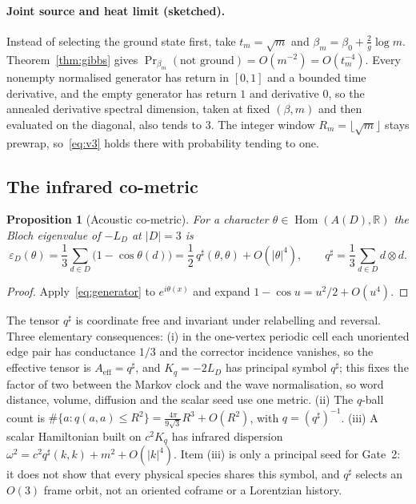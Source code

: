 \documentclass[11pt]{article}
\newtheorem{proposition}[theorem]{Proposition}
\theoremstyle{definition}
\theoremstyle{remark}
\newcommand{\R}{\mathbb{R}}
\begin{document}
\paragraph{Joint source and heat limit (sketched).} Instead of selecting the ground state
first, take $t_m=\sqrt m$ and $\beta_m=\beta_0+\frac2g\log m$. Theorem~\ref{thm:gibbs}
gives $\Pr_{\beta_m}(\text{not ground})=O(m^{-2})=O(t_m^{-4})$. Every nonempty normalised
generator has return in $[0,1]$ and a bounded time derivative, and the empty generator
has return $1$ and derivative $0$, so the annealed derivative spectral dimension, taken
at fixed $(\beta,m)$ and then evaluated on the diagonal, also tends to $3$. The integer
window $R_m=\lfloor\sqrt m\rfloor$ stays prewrap, so~\eqref{eq:v3} holds there with
probability tending to one.

\subsection{The infrared co-metric}
\label{sec:cometric}

\begin{proposition}[Acoustic co-metric]
\label{prop:cometric}
For a character $\theta\in\operatorname{Hom}(A(D),\R)$ the Bloch eigenvalue of $-L_D$ at
$|D|=3$ is
\begin{equation}
\varepsilon_D(\theta)=\frac13\sum_{d\in D}\bigl(1-\cos\theta(d)\bigr)
=\frac12\,q^\sharp(\theta,\theta)+O(|\theta|^4),\qquad
q^\sharp=\frac13\sum_{d\in D}d\otimes d .
\label{eq:cometric}
\end{equation}
\end{proposition}

\begin{proof}
Apply~\eqref{eq:generator} to $e^{i\theta(x)}$ and expand $1-\cos u=u^2/2+O(u^4)$.
\end{proof}

The tensor $q^\sharp$ is coordinate free and invariant under relabelling and
reversal. Three elementary consequences: (i) in the one-vertex periodic cell each
unoriented edge pair has conductance $1/3$ and the corrector incidence vanishes, so the
effective tensor is $A_{\mathrm{eff}}=q^\sharp$, and $K_q=-2L_D$ has principal symbol
$q^\sharp$; this fixes the factor of two between the Markov clock and the wave
normalisation, so word distance, volume, diffusion and the scalar seed use one metric.
(ii) The $q$-ball count is $\#\{a: q(a,a)\le R^2\}=\frac{4\pi}{9\sqrt3}R^3+O(R^2)$, with
$q=(q^\sharp)^{-1}$. (iii) A scalar Hamiltonian built on $c^2K_q$ has infrared dispersion
$\omega^2=c^2q^\sharp(k,k)+m^2+O(|k|^4)$. Item (iii) is only a principal seed for Gate~2:
it does not show that every physical species shares this symbol, and $q^\sharp$ selects
an $O(3)$ frame orbit, not an oriented coframe or a Lorentzian history.
\end{document}
